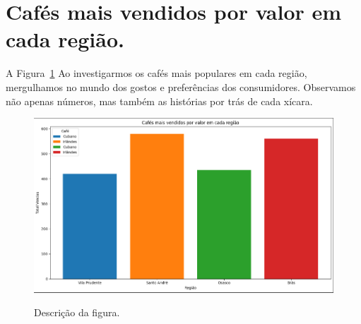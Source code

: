 \section{Cafés mais vendidos por valor em cada região.}
\label{sec:figura}
A Figura~\ref{figuras/Cafe-mais-vendido-valor-cada-regiao.png} Ao investigarmos os cafés mais populares em cada região, mergulhamos no mundo dos gostos e preferências dos consumidores. Observamos não apenas números, mas também as histórias por trás de cada xícara.
\begin{figure}[!ht]
	{\centering
		\caption{Descrição da figura.}
		\includegraphics[width=1.0\textwidth]{figuras/Cafe-mais-vendido-valor-cada-regiao.png}
		\label{figuras/Cafe-mais-vendido-valor-cada-regiao.png}
	}
\end{figure} \\ \\ \\ \\ \\ \\ \\ 







